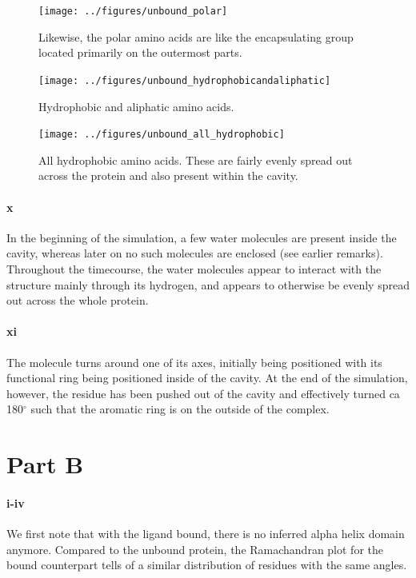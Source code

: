 \documentclass[10pt]{article}\usepackage[]{graphicx}\usepackage[]{color}
\theoremstyle{plain}
\begin{document}
\begin{multicols*}{2}
	\begin{figure}[H]
		\centering
		\texttt{[image: ../figures/unbound\_polar]}
		\caption{Likewise, the polar amino acids are like the encapsulating group located primarily on the outermost parts. }
		\label{fig:unbound_polar}
	\end{figure}
	
	  \begin{figure}[H]
		\centering
		\texttt{[image: ../figures/unbound\_hydrophobicandaliphatic]}
		\caption{Hydrophobic and aliphatic amino acids.}
		\label{fig:hydroandali}
	\end{figure}
	
  \begin{figure}[H]
		\centering
		\texttt{[image: ../figures/unbound\_all\_hydrophobic]}
		\caption{All hydrophobic amino acids. These are fairly evenly spread out across the protein and also present within the cavity.}
		\label{fig:unbound_all_hydrophobic}
	\end{figure}
		
		
	\paragraph*{x} 
	In the beginning of the simulation, a few water molecules are present inside the cavity, whereas later on no such molecules are enclosed (see earlier remarks). Throughout the timecourse, the water molecules appear to interact with the structure mainly through its hydrogen, and appears to otherwise be evenly spread out across the whole protein.
		
	\paragraph*{xi}
The molecule turns around one of its axes, initially being positioned with its functional ring being positioned inside of the cavity. At the end of the simulation, however, the residue has been pushed out of the cavity and effectively turned ca 180$^\circ$ such that the aromatic ring is on the outside of the complex.

\section*{Part B}
	\paragraph*{i-iv}
  We first note that with the ligand bound, there is no inferred alpha helix domain anymore. Compared to the unbound protein, the Ramachandran plot for the bound counterpart tells of a similar distribution of residues with the same angles.
  

\end{multicols*}
\end{document}
